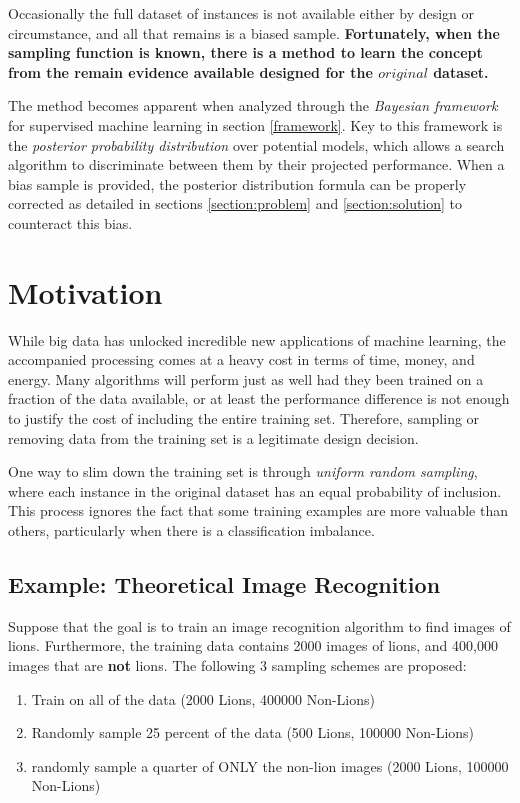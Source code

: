 \documentclass[twoside]{article}
\begin{document}
Occasionally the full dataset of instances is not available either by design or circumstance, and all that remains is a biased sample. \textbf{Fortunately, when the sampling function is known, there is a method to learn the concept from the remain evidence available designed for the \(original\) dataset.}

The method becomes apparent when analyzed through the \textit{Bayesian framework} for supervised machine learning in section \ref{framework}. Key to this framework is the \textit{posterior probability distribution} over potential models, which allows a search algorithm to discriminate between them by their projected performance. When a bias sample is provided, the posterior distribution formula can be properly corrected as detailed in sections \ref{section:problem} and \ref{section:solution} to counteract this bias.

\section{Motivation}

While big data has unlocked incredible new applications of machine learning, the accompanied processing comes at a heavy cost in terms of time, money, and energy. Many algorithms will perform just as well had they been trained on a fraction of the data available, or at least the performance difference is not enough to justify the cost of including the entire training set. Therefore, sampling or removing data from the training set is a legitimate design decision.

One way to slim down the training set is through \textit{uniform random sampling}, where each instance in the original dataset has an equal probability of inclusion. This process ignores the fact that some training examples are more valuable than others, particularly when there is a classification imbalance.

\subsection{Example: Theoretical Image Recognition}
\label{section:lion}

Suppose that the goal is to train an image recognition algorithm to find images of lions. Furthermore, the training data contains 2000 images of lions, and 400,000 images that are \textbf{not} lions. The following 3 sampling schemes are proposed:

\begin{enumerate}[label=(\Alph*)]
\item Train on all of the data (2000 Lions, 400000 Non-Lions)
\item Randomly sample 25 percent of the data (500 Lions, 100000 Non-Lions)
\item  randomly sample a quarter of ONLY the non-lion images (2000 Lions, 100000 Non-Lions)
\end{enumerate}
\end{document}
